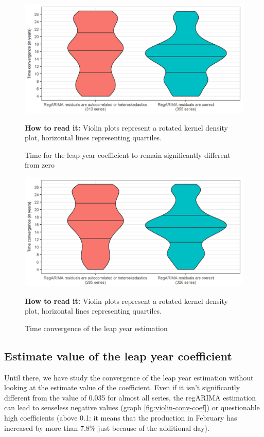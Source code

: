 \documentclass[]{article}
\theoremstyle{definition}
\theoremstyle{definition}
\theoremstyle{definition}
\theoremstyle{remark}
\begin{document}
\begin{figure}[!hbt]
\centering
\caption{Time for the leap year coefficient to remain significantly different from zero}
\label{fig:violin-conv-signif}
\includegraphics{img/violin_conv_signif.png}
\footnotesize

\textbf{How to read it:} Violin plots represent a rotated kernel density plot, horizontal lines representing quartiles.
\end{figure}

\begin{figure}[!hbt]
\centering
\caption{Time convergence of the leap year estimation}
\label{fig:violin-time-conv}
\includegraphics{img/violin_time_conv.png}
\footnotesize

\textbf{How to read it:} Violin plots represent a rotated kernel density plot, horizontal lines representing quartiles.
\end{figure}

\subsection{Estimate value of the leap year
coefficient}\label{estimate-value-of-the-leap-year-coefficient}

Until there, we have study the convergence of the leap year estimation
without looking at the estimate value of the coefficient. Even if it
isn't significantly different from the value of 0.035 for almost all
series, the regARIMA estimation can lead to senseless negative values
(graph \ref{fig:violin-conv-coef}) or questionable high coefficients
(above 0.1: it means that the production in February has increased by
more than 7.8\% just because of the additional day).
\end{document}
